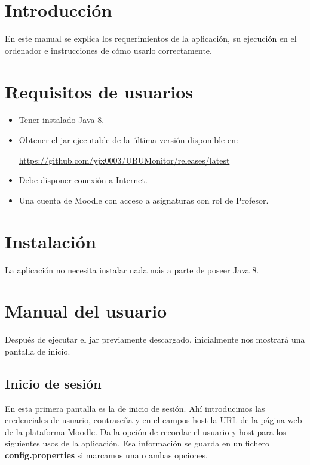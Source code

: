 
\section{Introducción}

En este manual se explica los requerimientos de la aplicación, su ejecución en el ordenador e instrucciones de cómo usarlo correctamente.


\section{Requisitos de usuarios} \label{sec:requisitos_usuarios}

\begin{itemize}
	
	\item Tener instalado \href{https://www.java.com/es/download/}{Java 8}. 
	\item Obtener el jar ejecutable de la última versión disponible en:
	
	\href{https://github.com/yjx0003/UBUMonitor/releases/latest}{https://github.com/yjx0003/UBUMonitor/releases/latest}
	\item Debe disponer conexión a Internet.
	\item Una cuenta de Moodle con acceso a asignaturas con rol de Profesor.
\end{itemize}



\section{Instalación}

La aplicación no necesita instalar nada más a parte de poseer Java 8.

\section{Manual del usuario}

Después de ejecutar el jar previamente descargado, inicialmente nos mostrará una pantalla de inicio.

\subsection{Inicio de sesión}

En esta primera pantalla es la de inicio de sesión. Ahí introducimos las credenciales de usuario, contraseña y en el campos host la URL de la página web de la plataforma Moodle.
Da la opción de recordar el usuario y host para los siguientes usos de la aplicación. Esa información se guarda en un fichero \textbf{config.properties} si marcamos una o ambas opciones.

